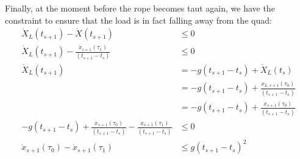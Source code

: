 \documentclass[11pt]{article}
\begin{document}
Finally, at the moment before the rope becomes taut again, we have the constraint to ensure that the load is in fact falling away from the quad: 
 \begin{align*}
 \dot{X}_L(t_{s+1}) - \dot{X}(t_{s+1}) & \le 0 \\
  \dot{X}_L(t_{s+1}) - \frac{\dot{x}_{s+1}(\tau_1)}{(t_{s+1}-t_s)} & \le 0 \\
 \dot{X}_L(t_{s+1}) &= -g(t_{s+1}-t_s) + \dot{X}_L(t_s) \\
&= -g(t_{s+1}-t_s) +  \frac{\dot{x}_{L, s+1}(\tau_0)}{(t_{s+1}-t_s)} \\
&= -g(t_{s+1}-t_s) +  \frac{\dot{x}_{s+1}(\tau_0)}{(t_{s+1}-t_s)} \\
 -g(t_{s+1}-t_s) +  \frac{\dot{x}_{s+1}(\tau_0)}{(t_{s+1}-t_s)} - \frac{\dot{x}_{s+1}(\tau_1)}{(t_{s+1}-t_s)} & \le 0 \\
 \dot{x}_{s+1}(\tau_0) - \dot{x}_{s+1}(\tau_1) & \le  g(t_{s+1}-t_s)^2
 \end{align*}
\end{document}
